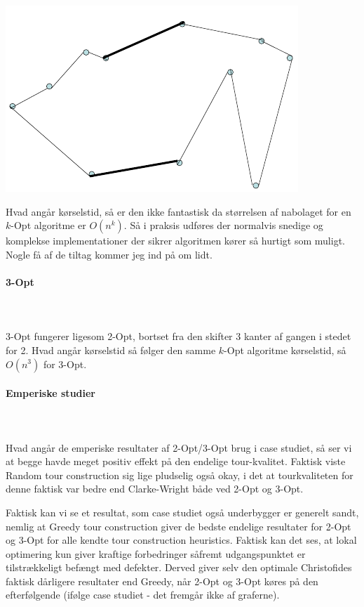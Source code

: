 \begin{center}
 \includegraphics[bb=0 0 313 204,scale=0.5]{./2opt3.png}
\end{center}

Hvad angår kørselstid, så er den ikke fantastisk da størrelsen af nabolaget for en $k$-Opt algoritme er $O(n^k)$. Så i praksis udføres der normalvis snedige og komplekse implementationer der sikrer algoritmen kører så hurtigt som muligt. Nogle få af de tiltag kommer jeg ind på om lidt.


\paragraph{3-Opt}
~\\
~\\
3-Opt fungerer ligesom 2-Opt, bortset fra den skifter 3 kanter af gangen i stedet for 2. Hvad angår kørselstid så følger den samme $k$-Opt algoritme kørselstid, så $O(n^3)$ for 3-Opt.


\paragraph{Emperiske studier}
~\\
~\\
Hvad angår de emperiske resultater af 2-Opt/3-Opt brug i case studiet, så ser vi at begge havde meget positiv effekt på den endelige tour-kvalitet. Faktisk viste Random tour construction sig lige pludselig også okay, i det at tourkvaliteten for denne faktisk var bedre end Clarke-Wright både ved 2-Opt og 3-Opt. 

Faktisk kan vi se et resultat, som case studiet også underbygger er generelt sandt, nemlig at Greedy tour construction giver de bedste endelige resultater for 2-Opt og 3-Opt for alle kendte tour construction heuristics. Faktisk kan det ses, at lokal optimering kun giver kraftige forbedringer såfremt udgangspunktet er tilstrækkeligt befængt med defekter. Derved giver selv den optimale Christofides faktisk dårligere resultater end Greedy, når 2-Opt og 3-Opt køres på den efterfølgende (ifølge case studiet - det fremgår ikke af graferne).


